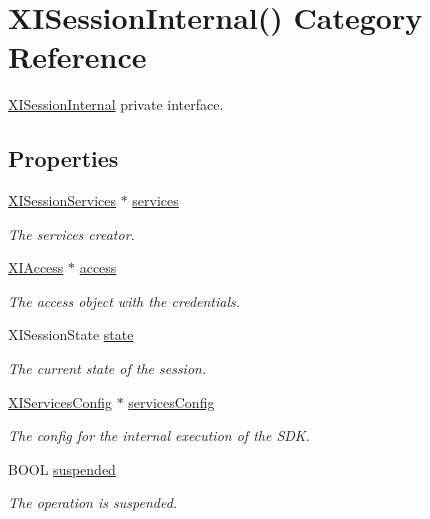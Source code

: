 \hypertarget{category_x_i_session_internal_07_08}{}\section{X\+I\+Session\+Internal() Category Reference}
\label{category_x_i_session_internal_07_08}


\hyperlink{interface_x_i_session_internal}{X\+I\+Session\+Internal} private interface.  


\subsection*{Properties}
\begin{DoxyCompactItemize}
\item 
\hyperlink{interface_x_i_session_services}{X\+I\+Session\+Services} $\ast$ \hyperlink{category_x_i_session_internal_07_08_a0bde5674ebda588ae03329b307ea476f}{services}
\begin{DoxyCompactList}\small\item\em The services creator. \end{DoxyCompactList}\item 
\hyperlink{class_x_i_access}{X\+I\+Access} $\ast$ \hyperlink{category_x_i_session_internal_07_08_aed4f95ad415dba8b614f31fd2de6b213}{access}
\begin{DoxyCompactList}\small\item\em The access object with the credentials. \end{DoxyCompactList}\item 
X\+I\+Session\+State \hyperlink{category_x_i_session_internal_07_08_a6d9c9e5903ac3ee10b6729e3e74f834f}{state}
\begin{DoxyCompactList}\small\item\em The current state of the session. \end{DoxyCompactList}\item 
\hyperlink{interface_x_i_services_config}{X\+I\+Services\+Config} $\ast$ \hyperlink{category_x_i_session_internal_07_08_acaf7c1e7cac39e0c0937b1ebd13c326c}{services\+Config}
\begin{DoxyCompactList}\small\item\em The config for the internal execution of the S\+DK. \end{DoxyCompactList}\item 
B\+O\+OL \hyperlink{category_x_i_session_internal_07_08_aa7c7df651a614de08864a6ddfbba1165}{suspended}
\begin{DoxyCompactList}\small\item\em The operation is suspended. \end{DoxyCompactList}\item 

\end{DoxyCompactItemize}
